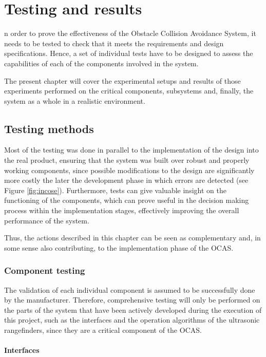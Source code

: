 
\let\textcircled=\pgftextcircled
\chapter{Testing and results} \label{chap:testing}

n order to prove the effectiveness of the Obstacle Collision Avoidance System, it needs to be tested to check that it meets the requirements and design specifications.
Hence, a set of individual tests have to be designed to assess the capabilities of each of the components involved in the system.

The present chapter will cover the experimental setups and results of those experiments performed on the critical components, subsystems and, finally, the system as a whole in a realistic environment.


\section{Testing methods}

Most of the testing was done in parallel to the implementation of the design into the real product, ensuring that the system was built over robust and properly working components, since possible modifications to the design are significantly more costly the later the development phase in which errors are detected (see Figure \ref{fig:incose}).
Furthermore, tests can give valuable insight on the functioning of the components, which can prove useful in the decision making process within the implementation stages, effectively improving the overall performance of the system.

Thus, the actions described in this chapter can be seen as complementary and, in some sense also contributing, to the implementation phase of the OCAS.

\subsection{Component testing}

The validation of each individual component is assumed to be successfully done by the manufacturer.
Therefore, comprehensive testing will only be performed on the parts of the system that have been actively developed during the execution of this project, such as the interfaces and the operation algorithms of the ultrasonic rangefinders, since they are a critical component of the OCAS.

\subsubsection{Interfaces}

